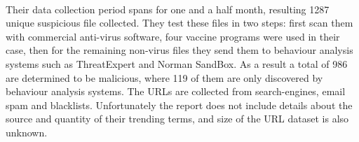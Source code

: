 \paragraph{}
Their data collection period spans for one and a half month, resulting 1287 
unique suspicious file collected. They test these files in two steps: first 
scan them with commercial anti-virus software, four vaccine programs were used 
in their case, then for the remaining non-virus files they send them to 
behaviour analysis systems such as ThreatExpert and Norman SandBox. As a result 
a total of 986 are determined to be malicious, where 119 of them are only 
discovered by behaviour analysis systems. 
The URLs are collected from search-engines, email spam and blacklists. 
Unfortunately the report does not include details about the source and 
quantity of their trending terms, and size of the URL dataset is also unknown. 

